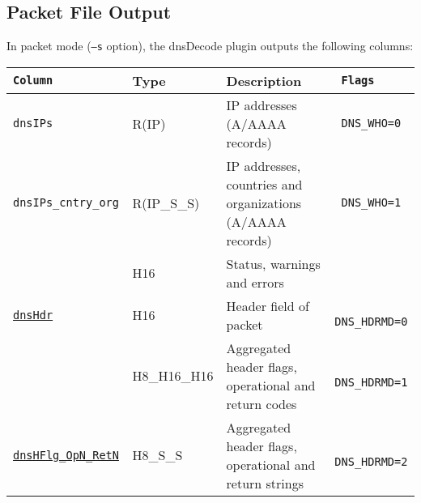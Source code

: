 \documentclass[documentation]{subfiles}
\begin{document}
%
%

\subsection{Packet File Output}
In packet mode ({\tt --s} option), the dnsDecode plugin outputs the following columns:
\begin{longtable}{>{\tt}lll>{\tt\small}l}
    \toprule
    {\bf Column}                                  & {\bf Type}   & {\bf Description}                                            & {\bf Flags}\\
    \midrule\endhead%
    dnsIPs                                        & R(IP)        & IP addresses (A/AAAA records)                                & DNS\_WHO=0\\
    dnsIPs\_cntry\_org                            & R(IP\_S\_S)  & IP addresses, countries and organizations (A/AAAA records)   & DNS\_WHO=1\\
    \nameref{dnsStat}                             & H16          & Status, warnings and errors                                  & \\
    \hyperref[dnsHdrOPField]{dnsHdr}              & H16          & Header field of packet                                       & DNS\_HDRMD=0\\
    \nameref{dnsHFlgOpCRetC}                      & H8\_H16\_H16 & Aggregated header flags, operational and return codes        & DNS\_HDRMD=1\\
    \hyperref[dnsHFlgOpCRetC]{dnsHFlg\_OpN\_RetN} & H8\_S\_S     & Aggregated header flags, operational and return strings      & DNS\_HDRMD=2\\

\end{longtable}
\end{document}
